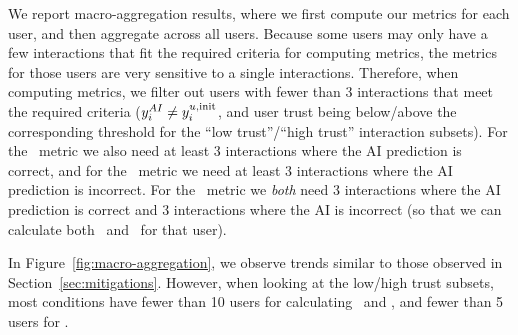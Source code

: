 
We report macro-aggregation results, where we first compute our metrics for each user, and then aggregate across all users. 
Because some users may only have a few interactions that fit the required criteria for computing metrics, the metrics for those users are very sensitive to a single interactions. 
Therefore, when computing metrics, we filter out users with fewer than 3 interactions that meet the required criteria ($y^{AI}_i \neq y^{u,\text{init}}_i$, and user trust being below/above the corresponding threshold for the ``low trust''/``high trust'' interaction subsets). 
For the \underreliance\ metric we also need at least 3 interactions where the AI prediction is correct, and for the \overreliance\ metric we need at least 3 interactions where the AI prediction is incorrect.
For the \totalinapprel\ metric we \emph{both} need 3 interactions where the AI prediction is correct and 3 interactions where the AI is incorrect (so that we can calculate both \underreliance\ and \overreliance\ for that user).

In Figure~\ref{fig:macro-aggregation}, we observe trends similar to those observed in Section~\ref{sec:mitigations}. However, when looking at the low/high trust subsets, most conditions have fewer than 10 users for calculating \underreliance\ and \overreliance, and fewer than 5 users for \totalinapprel.
